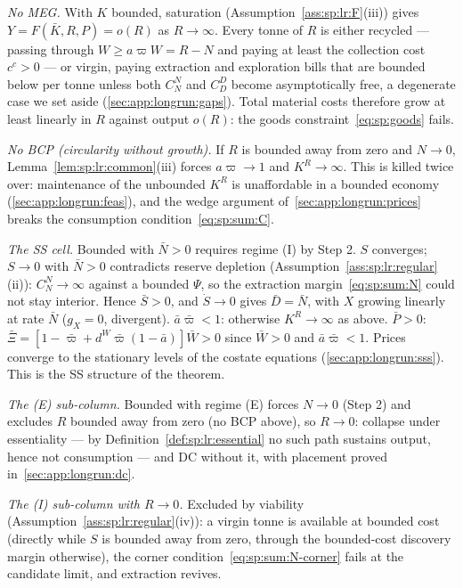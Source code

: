 \emph{No MEG.} With $K$ bounded, saturation (Assumption~\ref{ass:sp:lr:F}(iii)) gives
$Y=F\left(\bar K,R,P\right)=o\left(R\right)$ as $R\to\infty$. Every tonne of $R$ is either
recycled --- passing through $W\ge a\varpi W=R-N$ and paying at least the collection cost
$c^c>0$ --- or virgin, paying extraction and exploration bills that are bounded below per tonne
unless both $C^N_N$ and $C^D_D$ become asymptotically free, a degenerate case we set aside
(\ref{sec:app:longrun:gaps}). Total material costs therefore grow at least linearly in $R$
against output $o\left(R\right)$: the goods constraint~\eqref{eq:sp:goods} fails.

\emph{No BCP (circularity without growth).} If $R$ is bounded away from zero and $N\to0$,
Lemma~\ref{lem:sp:lr:common}(iii) forces $a\varpi\to1$ and $K^R\to\infty$. This is killed twice
over: maintenance of the unbounded $K^R$ is unaffordable in a bounded economy
(\ref{sec:app:longrun:feas}), and the wedge argument of~\ref{sec:app:longrun:prices} breaks the
consumption condition~\eqref{eq:sp:sum:C}.

\emph{The SS cell.} Bounded with $\bar N>0$ requires regime (I) by Step 2. $S$ converges;
$S\to0$ with $\bar N>0$ contradicts reserve depletion
(Assumption~\ref{ass:sp:lr:regular}(ii)): $C^N_N\to\infty$ against a bounded $\Psi$, so the
extraction margin~\eqref{eq:sp:sum:N} could not stay interior. Hence $\bar S>0$, and
$\dot S\to0$ gives $\bar D=\bar N$, with $X$ growing linearly at rate $\bar N$
($g_X=0$, divergent). $\bar a\bar\varpi<1$: otherwise $K^R\to\infty$ as above. $\bar P>0$:
$\bar\Xi=\left[1-\bar\varpi+d^W\bar\varpi\left(1-\bar a\right)\right]\bar W>0$ since
$\bar W>0$ and $\bar a\bar\varpi<1$. Prices converge to the stationary levels of the costate
equations (\ref{sec:app:longrun:sss}). This is the SS structure of the theorem.

\emph{The (E) sub-column.} Bounded with regime (E) forces $N\to0$ (Step 2) and excludes $R$
bounded away from zero (no BCP above), so $R\to0$: collapse under essentiality --- by
Definition~\ref{def:sp:lr:essential} no such path sustains output, hence not consumption ---
and DC without it, with placement proved in~\ref{sec:app:longrun:dc}.

\emph{The (I) sub-column with $R\to0$.} Excluded by viability
(Assumption~\ref{ass:sp:lr:regular}(iv)): a virgin tonne is available at bounded cost (directly
while $S$ is bounded away from zero, through the bounded-cost discovery margin otherwise), the
corner condition~\eqref{eq:sp:sum:N-corner} fails at the candidate limit, and extraction
revives.

